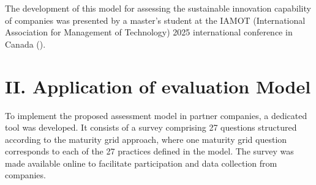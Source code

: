 \documentclass[
  12pt,
  oneside]{book}
\begin{document}
\begin{table}

\caption{\label{tbl-maturity}Maturity grid example for innovation
networks --IN-.}


\end{table}%

The development of this model for assessing the sustainable innovation
capability of companies was presented by a master's student at the IAMOT
(International Association for Management of Technology) 2025
international conference in Canada
().

\section{II. Application of evaluation
Model}\label{ii.-application-of-evaluation-model}

To implement the proposed assessment model in partner companies, a
dedicated tool was developed. It consists of a survey comprising 27
questions structured according to the maturity grid approach, where one
maturity grid question corresponds to each of the 27 practices defined
in the model. The survey was made available online to facilitate
participation and data collection from companies.
\end{document}
